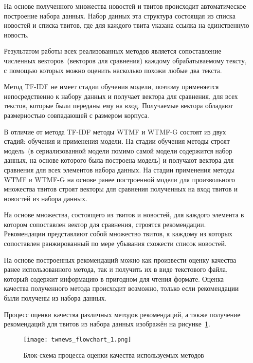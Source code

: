     На основе полученного множества новостей и твитов происходит автоматическое построение набора данных. Набор данных эта структура состоящая из списка новостей и списка твитов, где для каждого твита указана ссылка на единственную новость.

    Результатом работы всех реализованных методов является сопоставление численных векторов~(векторов для сравнения) каждому обрабатываемому тексту, с помощью которых можно оценить насколько похожи любые два текста. 

    Метод TF-IDF не имеет стадии обучения модели, поэтому применяется непосредственно к набору данных и получает вектора для сравнения, для всех текстов, которые были переданы ему на вход. Получаемые вектора обладают размерностью совпадающей с размером корпуса.

    В отличие от метода TF-IDF методы WTMF и WTMF-G состоят из двух стадий: обучения и применения модели. На стадии обучения методы строят модель~(в сериализованной модели помимо самой модели содержится набор данных, на основе которого была построена модель) и получают вектора для сравнения для всех элементов набора данных. На стадии применения методы WTMF и WTMF-G на основе ранее построенной модели для произвольного множества твитов строят векторы для сравнения полученных на вход твитов и новостей из набора данных.

    На основе множества, состоящего из твитов и новостей, для каждого элемента в котором сопоставлен вектор для сравнения, строятся рекомендации.
    Рекомендации представляют собой множество твитов, к каждому из которых сопоставлен ранжированный по мере убывания схожести список новостей.

    На основе построенных рекомендаций можно как произвести оценку качества ранее использованного метода, так и получить их в виде текстового файла, который содержит информацию в пригодном для чтения формате. Оценка качества полученного метода происходит возможно, только если рекомендации были получены из набора данных.

    Процесс оценки качества различных методов рекомендаций, а также получение рекомендаций для твитов из набора данных изображён на рисунке~\ref{pic:twnews_flowchart_1}.

    \begin{figure}[h!]
            \center
            \texttt{[image: twnews\_flowchart\_1.png]}
            \caption{Блок-схема процесса оценки качества используемых методов}
            \label{pic:twnews_flowchart_1}
    \end{figure}

